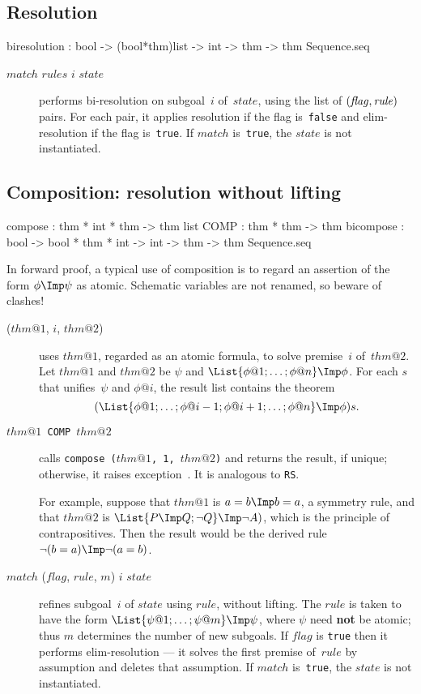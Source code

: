 \subsection{Resolution}
\begin{ttbox} 
biresolution : bool -> (bool*thm)list -> int -> thm
               -> thm Sequence.seq
\end{ttbox}
\begin{description}
\item[ $match$ $rules$ $i$ $state$] 
performs bi-resolution on subgoal~$i$ of~$state$, using the list of $\it
(flag,rule)$ pairs.  For each pair, it applies resolution if the flag
is~{\tt false} and elim-resolution if the flag is~{\tt true}.  If $match$
is~{\tt true}, the $state$ is not instantiated.
\end{description}


\subsection{Composition: resolution without lifting}
\begin{ttbox}
compose   : thm * int * thm -> thm list
COMP      : thm * thm -> thm
bicompose : bool -> bool * thm * int -> int -> thm
            -> thm Sequence.seq
\end{ttbox}
In forward proof, a typical use of composition is to regard an assertion of
the form $\phi\Imp\psi$ as atomic.  Schematic variables are not renamed, so
beware of clashes!
\begin{description}
\item[ ($thm@1$, $i$, $thm@2$)] 
uses $thm@1$, regarded as an atomic formula, to solve premise~$i$
of~$thm@2$.  Let $thm@1$ and $thm@2$ be $\psi$ and $\List{\phi@1; \ldots;
\phi@n} \Imp \phi$.  For each $s$ that unifies~$\psi$ and $\phi@i$, the
result list contains the theorem
\[ (\List{\phi@1; \ldots; \phi@{i-1}; \phi@{i+1}; \ldots; \phi@n} \Imp \phi)s.
\]

\item[\tt $thm@1$ COMP $thm@2$] 
calls \hbox{\tt compose ($thm@1$, 1, $thm@2$)} and returns the result, if
unique; otherwise, it raises exception~\@.  It is
analogous to {\tt RS}\@.  

For example, suppose that $thm@1$ is $a=b\Imp b=a$, a symmetry rule, and
that $thm@2$ is $\List{P\Imp Q; \neg Q} \Imp\neg A)$, which is the
principle of contrapositives.  Then the result would be the
derived rule $\neg(b=a)\Imp\neg(a=b)$.

\item[ $match$ ($flag$, $rule$, $m$) $i$ $state$]
refines subgoal~$i$ of $state$ using $rule$, without lifting.  The $rule$
is taken to have the form $\List{\psi@1; \ldots; \psi@m} \Imp \psi$, where
$\psi$ need {\bf not} be atomic; thus $m$ determines the number of new
subgoals.  If $flag$ is {\tt true} then it performs elim-resolution --- it
solves the first premise of~$rule$ by assumption and deletes that
assumption.  If $match$ is~{\tt true}, the $state$ is not instantiated.
\end{description}


